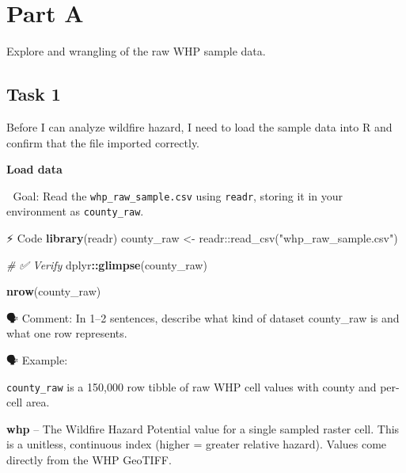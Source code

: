 \documentclass[
  12pt,
]{scrreprt}
\newenvironment{Shaded}{\begin{snugshade}}{\end{snugshade}}
\newcommand{\AttributeTok}[1]{\textcolor[rgb]{0.13,0.29,0.53}{#1}}
\newcommand{\CommentTok}[1]{\textcolor[rgb]{0.56,0.35,0.01}{\textit{#1}}}
\newcommand{\FunctionTok}[1]{\textcolor[rgb]{0.13,0.29,0.53}{\textbf{#1}}}
\newcommand{\NormalTok}[1]{#1}
\newcommand{\OtherTok}[1]{\textcolor[rgb]{0.56,0.35,0.01}{#1}}
\newcommand{\SpecialCharTok}[1]{\textcolor[rgb]{0.81,0.36,0.00}{\textbf{#1}}}
\newcommand{\StringTok}[1]{\textcolor[rgb]{0.31,0.60,0.02}{#1}}
\begin{document}
\chapter{Part A}\label{part-a}

Explore and wrangling of the raw WHP sample data.

\section{Task 1}\label{task-1}

Before I can analyze wildfire hazard, I need to load the sample data into R and confirm that the file imported correctly.

\textbf{Load data}

🎯 Goal: Read the \texttt{whp\_raw\_sample.csv} using \texttt{readr}, storing it in your environment as \texttt{county\_raw}.

\begin{Shaded}
\begin{Highlighting}[]
\NormalTok{⚡ Code}
\FunctionTok{library}\NormalTok{(readr)}
\StringTok{\textasciigrave{}}\AttributeTok{county\_raw}\StringTok{\textasciigrave{}} \OtherTok{\textless{}{-}} \StringTok{\textasciigrave{}}\AttributeTok{readr::read\_csv}\StringTok{\textasciigrave{}}\NormalTok{(}\StringTok{\textasciigrave{}}\AttributeTok{"whp\_raw\_sample.csv"}\StringTok{\textasciigrave{}}\NormalTok{)}
\end{Highlighting}
\end{Shaded}

\begin{Shaded}
\begin{Highlighting}[]
\CommentTok{\# ✅  Verify }
\NormalTok{dplyr}\SpecialCharTok{::}\FunctionTok{glimpse}\NormalTok{(county\_raw)}

\FunctionTok{nrow}\NormalTok{(county\_raw)}
\end{Highlighting}
\end{Shaded}

🗣 Comment: In 1--2 sentences, describe what kind of dataset county\_raw is and what one row represents.

🗣 Example:

\texttt{county\_raw} is a 150,000 row tibble of raw WHP cell values with county and per-cell area.

\textbf{whp} -- The Wildfire Hazard Potential value for a single sampled raster cell. This is a unitless, continuous index (higher = greater relative hazard). Values come directly from the WHP GeoTIFF.
\end{document}
